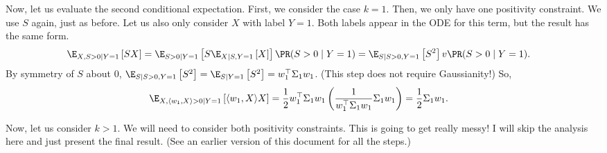 \documentclass{article}
\begin{document}
Now, let us evaluate the second conditional expectation.
First, we consider the case $k=1$.
Then, we only have one positivity constraint.
We use $S$ again, just as before.
Let us also only consider $X$ with label $Y=1$.
Both labels appear in the ODE for this term, but the result has the same form.
\begin{align} \label{eq:xx_w1_cond_exp}
  \E_{X, S > 0 \mid Y=1} \left[ S X \right]
  &= \E_{S > 0 \mid Y=1} \left[ S \E_{X \mid S, Y=1} \left[ X \right] \right] \PR( S > 0 \mid Y = 1  )
  = \E_{S \mid S > 0, Y=1} \left[ S^2 \right] v \PR( S > 0 \mid Y = 1 ).
\end{align}
By symmetry of $S$ about 0, $\E_{S \mid S > 0, Y=1} \left[ S^2 \right] = \E_{S \mid Y=1} \left[ S^2 \right] = w_1^\top \Sigma_1 w_1$.
(This step does not require Gaussianity!)
So,
\begin{align}
  \E_{X,\langle w_1, X \rangle > 0 \mid Y=1} \left[ \langle w_1, X \rangle X \right]
  &= \frac{1}{2} w_1^\top \Sigma_1 w_1 \left( \frac{1}{ w_1^\top \Sigma_1 w_1 } \Sigma_1 w_1 \right)
  = \frac{1}{2} \Sigma_1 w_1.
\end{align}

Now, let us consider $k>1$.
We will need to consider both positivity constraints.
This is going to get really messy!
I will skip the analysis here and just present the final result.
(See an earlier version of this document for all the steps.)
\end{document}
